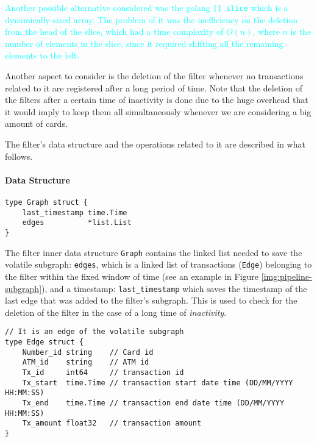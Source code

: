 \begin{graysection}
\textcolor{cyan}{Another possible alternative considered was the golang \texttt{[] slice} which is a dynamically-sized array. The problem of it was the inefficiency on the deletion from the head of the slice, which had a time complexity of 
$O(n)$, where $n$ is the number of elements in the slice, since it required shifting all the remaining elements to the left.}

Another aspect to consider is the deletion of the filter whenever no transactions related to it are registered after a long period of time. Note that the deletion of the filters after a certain time of inactivity is done due to the huge overhead that it would imply to keep them all simultaneously whenever we are considering a big amount of cards.

The filter's data structure and the operations related to it are described in what follows.

\paragraph{Data Structure}

\begin{center}
\lstset{style=golangStyle}
\begin{lstlisting}[caption={filter subgraph data structure}]
type Graph struct {
	last_timestamp time.Time
	edges          *list.List
}
\end{lstlisting}
\end{center}

The filter inner data structure \texttt{Graph} contains the linked list needed to save the volatile subgraph: \texttt{edges}, which is a linked list of transactions (\texttt{Edge}) belonging to the filter within the fixed window of time (see an example in Figure \ref{img:pipeline-subgraph}), and a timestamp: \texttt{last\_timestamp} which saves the timestamp of the last edge that was added to the filter's subgraph. This is used to check for the deletion of the filter in the case of a long time of \textit{inactivity}.

\begin{center}
\lstset{style=golangStyle}
\begin{lstlisting}[caption={Edge of the volatile subgraph, a transaction belonging to the filter}]
// It is an edge of the volatile subgraph
type Edge struct {
	Number_id string    // Card id
	ATM_id    string    // ATM id
	Tx_id     int64     // transaction id
	Tx_start  time.Time // transaction start date time (DD/MM/YYYY HH:MM:SS)
	Tx_end    time.Time // transaction end date time (DD/MM/YYYY HH:MM:SS)
	Tx_amount float32   // transaction amount
}
\end{lstlisting}
\end{center}


\end{graysection}
